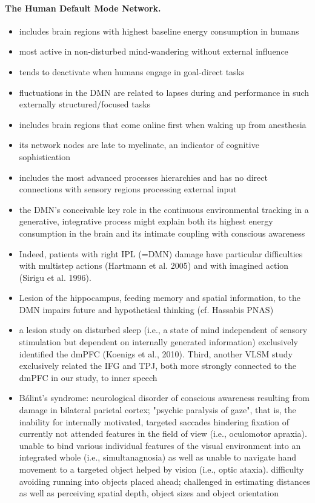 \documentclass{article} %
\begin{document}
\paragraph{The Human Default Mode Network.}
\begin{itemize}
  \item includes brain regions with highest baseline energy consumption in humans
  \item most active in non-disturbed mind-wandering without external influence
  \item tends to deactivate when humans engage in goal-direct tasks
  \item fluctuations in the DMN are related to lapses during and performance in
  such externally structured/focused tasks
  \item includes brain regions that come online first when waking up from
  anesthesia
  \item its network nodes are late to myelinate, an indicator of cognitive sophistication
  \item includes the most advanced processes hierarchies and has
  no direct connections with sensory regions processing external input
  \item the DMN's conceivable key role in the continuous environmental
  tracking in a generative, integrative process might explain both its highest energy consumption in the brain and its intimate coupling with conscious awareness
  \item Indeed, patients with right IPL (=DMN) damage have particular difficulties
  with multistep actions (Hartmann et al. 2005)
  and with imagined action (Sirigu et al. 1996).
  \item Lesion of the hippocampus, feeding memory and spatial information, to the
  DMN impairs future and hypothetical thinking (cf. Hassabis PNAS)
  \item a lesion study on disturbed sleep (i.e., a state of mind
  independent of sensory stimulation but dependent on
  internally generated information) exclusively identified
  the dmPFC (Koenigs et al., 2010). Third, another VLSM study exclusively
  related the IFG and TPJ, both more strongly connected to the
  dmPFC in our study, to inner speech
  \item Bálint's syndrome: neurological disorder of conscious
  awareness resulting from damage in bilateral parietal cortex;
  "psychic paralysis of gaze", that is, the inability for internally
  motivated, targeted saccades hindering fixation of currently not
  attended features in the field of view (i.e., oculomotor apraxia).
  unable to bind various individual features of the visual
  environment into an integrated whole (i.e., simultanagnosia)
  as well as unable to navigate hand movement to a targeted
  object helped by vision (i.e., optic ataxia). 
  difficulty avoiding running into objects placed ahead;
  challenged in estimating distances as well as perceiving
  spatial depth, object sizes and object orientation
\end{itemize}
\end{document}
